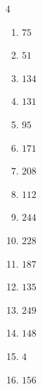 \begin{multicols}{4}
\begin{enumerate}
  \item $75$


  \item $51$


  \item $134$


  \item $131$


  \item $95$


  \item $171$


  \item $208$


  \item $112$


  \item $244$


  \item $228$


\columnbreak %

  \item $187$


  \item $135$


  \item $249$


  \item $148$


  \item $4$


  \item $156$


\end{enumerate}
\end{multicols}
